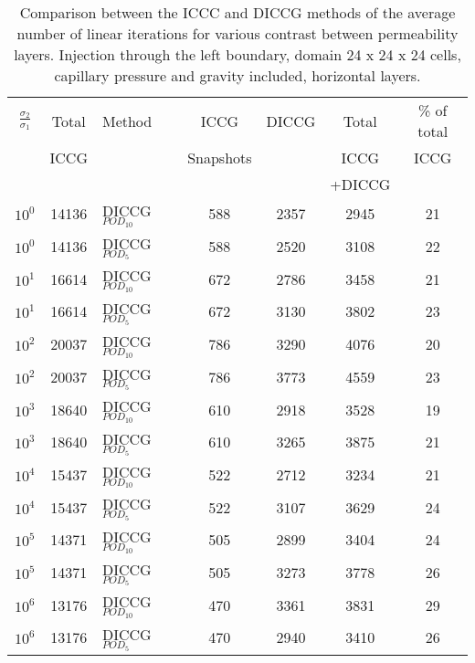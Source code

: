 \documentclass[12pt]{article}
\begin{document}
\begin{table}[!h]\centering
\begin{minipage}{1\textwidth}
 \centering
\begin{tabular}{ ||c|c||l|c|c|c|c||} 
\hline
$\frac{\sigma_2}{\sigma_1}$&Total&Method  & ICCG&DICCG &Total&\% of total\\ 
                           & ICCG     &  & Snapshots& &ICCG& ICCG\\ 
                            &     &  & & &+DICCG& \\
\hline  
$10^{0}$ &14136& DICCG$_{POD_{10}}$&588&2357&2945&21 \\ 
\hline  
$10^{0}$ &14136& DICCG$_{POD_{5}}$&588&2520&3108&22 \\ 
\hline  
$10^{1}$ &16614& DICCG$_{POD_{10}}$&672&2786&3458&21 \\ 
\hline  
$10^{1}$ &16614& DICCG$_{POD_{5}}$&672&3130&3802&23 \\ 
\hline  
$10^{2}$ &20037& DICCG$_{POD_{10}}$&786&3290&4076&20 \\ 
\hline  
$10^{2}$ &20037& DICCG$_{POD_{5}}$&786&3773&4559&23 \\ 
\hline 
$10^{3}$ &18640& DICCG$_{POD_{10}}$&610&2918&3528&19 \\ 
\hline  
$10^{3}$ &18640& DICCG$_{POD_{5}}$&610&3265&3875&21 \\ 
\hline 
$10^{4}$ &15437& DICCG$_{POD_{10}}$&522&2712&3234&21 \\ 
\hline  
$10^{4}$ &15437& DICCG$_{POD_{5}}$&522&3107&3629&24 \\ 
\hline  
$10^{5}$ &14371& DICCG$_{POD_{10}}$&505&2899&3404&24 \\ 
\hline  
$10^{5}$ &14371& DICCG$_{POD_{5}}$&505&3273&3778&26 \\ 
\hline
$10^{6}$ &13176& DICCG$_{POD_{10}}$&470&3361&3831&29 \\ 
\hline  
$10^{6}$ &13176& DICCG$_{POD_{5}}$&470&2940&3410&26 \\ 
\hline 
\end{tabular} 
\caption{Comparison between the ICCC and DICCG methods of the average number of linear iterations for various contrast between permeability layers. Injection through the left boundary, domain 24 x 24 x 24 cells, capillary pressure and gravity included, horizontal layers.}\label{table:liter1c} 
\end{minipage}  
\end{table}  
\end{document}
